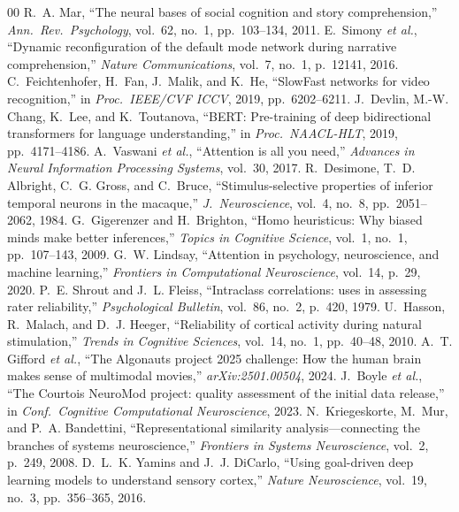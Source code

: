 \documentclass[conference]{IEEEtran}
\begin{document}
\begin{thebibliography}{00}
 R.~A. Mar, ``The neural bases of social cognition and story comprehension,'' \textit{Ann.~Rev.~Psychology}, vol.~62, no.~1, pp.~103--134, 2011.
 E.~Simony \textit{et al.}, ``Dynamic reconfiguration of the default mode network during narrative comprehension,'' \textit{Nature Communications}, vol.~7, no.~1, p.~12141, 2016.
 C.~Feichtenhofer, H.~Fan, J.~Malik, and K.~He, ``SlowFast networks for video recognition,'' in \textit{Proc.~IEEE/CVF ICCV}, 2019, pp.~6202--6211.
 J.~Devlin, M.-W. Chang, K.~Lee, and K.~Toutanova, ``BERT: Pre-training of deep bidirectional transformers for language understanding,'' in \textit{Proc.~NAACL-HLT}, 2019, pp.~4171--4186.
 A.~Vaswani \textit{et al.}, ``Attention is all you need,'' \textit{Advances in Neural Information Processing Systems}, vol.~30, 2017.
 R.~Desimone, T.~D. Albright, C.~G. Gross, and C.~Bruce, ``Stimulus-selective properties of inferior temporal neurons in the macaque,'' \textit{J.~Neuroscience}, vol.~4, no.~8, pp.~2051--2062, 1984.
 G.~Gigerenzer and H.~Brighton, ``Homo heuristicus: Why biased minds make better inferences,'' \textit{Topics in Cognitive Science}, vol.~1, no.~1, pp.~107--143, 2009.
 G.~W. Lindsay, ``Attention in psychology, neuroscience, and machine learning,'' \textit{Frontiers in Computational Neuroscience}, vol.~14, p.~29, 2020.
 P.~E. Shrout and J.~L. Fleiss, ``Intraclass correlations: uses in assessing rater reliability,'' \textit{Psychological Bulletin}, vol.~86, no.~2, p.~420, 1979.
 U.~Hasson, R.~Malach, and D.~J. Heeger, ``Reliability of cortical activity during natural stimulation,'' \textit{Trends in Cognitive Sciences}, vol.~14, no.~1, pp.~40--48, 2010.
 A.~T. Gifford \textit{et al.}, ``The Algonauts project 2025 challenge: How the human brain makes sense of multimodal movies,'' \textit{arXiv:2501.00504}, 2024.
 J.~Boyle \textit{et al.}, ``The Courtois NeuroMod project: quality assessment of the initial data release,'' in \textit{Conf.~Cognitive Computational Neuroscience}, 2023.
 N.~Kriegeskorte, M.~Mur, and P.~A. Bandettini, ``Representational similarity analysis---connecting the branches of systems neuroscience,'' \textit{Frontiers in Systems Neuroscience}, vol.~2, p.~249, 2008.
 D.~L.~K. Yamins and J.~J. DiCarlo, ``Using goal-driven deep learning models to understand sensory cortex,'' \textit{Nature Neuroscience}, vol.~19, no.~3, pp.~356--365, 2016.

\end{thebibliography}
\end{document}
